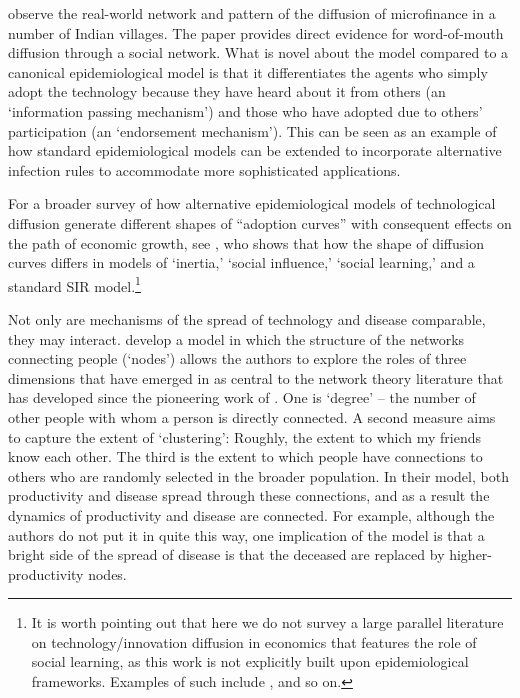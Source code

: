 \href{https://pubmed.ncbi.nlm.nih.gov/23888042/}{\cite{banerjee2013diffusion}} observe the real-world network and pattern of the diffusion of microfinance in a number of Indian villages. The paper provides direct evidence for word-of-mouth diffusion through a social network. What is novel about the model compared to a canonical epidemiological model is that it differentiates the agents who simply adopt the technology because they have heard about it from others (an `information passing mechanism') and those who have adopted due to others' participation (an `endorsement mechanism'). This can be seen as an example of how standard epidemiological models can be extended to incorporate alternative infection rules to accommodate more sophisticated applications.


For a broader survey of how alternative epidemiological models of technological diffusion generate different shapes of  ``adoption curves'' with consequent effects on the path of economic growth, see  \href{https://github.com/iworld1991/EpiExp/blob/master/Literature/young2009innovation.pdf}{\cite{young2009innovation}}, who shows that how the shape of diffusion curves differs in models of `inertia,' `social influence,' `social learning,' and a standard SIR model.\footnote{It is worth pointing out that here we do not survey a large parallel literature on technology/innovation diffusion in economics that features the role of social learning, as this work is not explicitly built upon epidemiological frameworks. Examples of such include  \href{https://www.researchgate.net/publication/222676428_Social_Learning_in_a_Heterogeneous_Population_Technology_Diffusion_in_the_Indian_Green_Revolution}{\cite{munshi2004social}},   \href{https://www.jstor.org/stable/41038754}{\cite{comin2010exploration}} and so on.}  %

Not only are mechanisms of the spread of technology and disease comparable, they may interact.  \href{https://github.com/iworld1991/EpiExp/blob/master/Literature/fogli2012germs.pdf}{\cite{fogli2021germs}} develop a model in which the structure of the networks connecting people (`nodes') allows the authors to explore the roles of three dimensions that have emerged in as central to the network theory literature that has developed since the pioneering work of \cite{erdos1960evolution}.  One is `degree' -- the number of other people with whom a person is directly connected.  A second measure aims to capture the extent of `clustering': Roughly, the extent to which my friends know each other.  The third is the extent to which people have connections to others who are randomly selected in the broader population.  In their model, both productivity and disease spread through these connections, and as a result the dynamics of productivity and disease are connected.  For example, although the authors do not put it in quite this way, one implication of the model is that a bright side of the spread of disease is that the deceased are replaced by higher-productivity nodes.%
